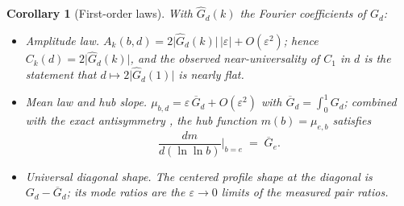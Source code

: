 \documentclass[11pt,a4paper]{article}
\newtheorem{corollary}[theorem]{Corollary}
\theoremstyle{definition}
\theoremstyle{remark}
\begin{document}
\begin{corollary}[First-order laws]\label{cor:firstorder}
With $\widehat G_d(k)$ the Fourier coefficients of $G_d$:
\begin{itemize}
\item[(i)] \emph{Amplitude law.} $A_k(b,d)=2\lvert\widehat
G_d(k)\rvert\,\lvert\varepsilon\rvert+O(\varepsilon^2)$; hence
$C_k(d)=2\lvert\widehat G_d(k)\rvert$, and the observed near-universality of $C_1$ in $d$ is
the statement that $d\mapsto2\lvert\widehat G_d(1)\rvert$ is nearly flat.
\item[(ii)] \emph{Mean law and hub slope.}
$\mu_{b,d}=\varepsilon\,\overline{G}_d+O(\varepsilon^2)$ with
$\overline G_d=\int_0^1G_d$; combined with the exact antisymmetry \cite[Thm.~B]{unified},
the hub function $m(b)=\mu_{e,b}$ satisfies
\[
\frac{dm}{d(\ln\ln b)}\Big|_{b=e}\;=\;\overline G_e .
\]
\item[(iii)] \emph{Universal diagonal shape.} The centered profile shape at the diagonal is
$G_d-\overline G_d$; its mode ratios are the $\varepsilon\to0$ limits of the measured pair
ratios.
\end{itemize}
\end{corollary}
\end{document}
